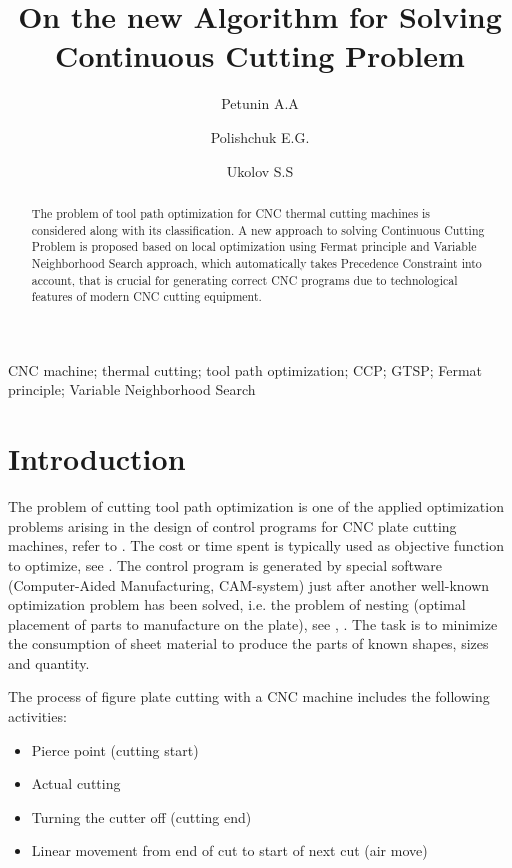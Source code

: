 \documentclass{ifacconf}
\begin{document}
\begin{frontmatter}

\title{On the new Algorithm for Solving Continuous Cutting Problem}

\author[urfu]{Petunin A.A}
\author[urfu]{Polishchuk E.G.}
\author[urfu]{Ukolov S.S}

\address[urfu]{Ural Federal University, Yekaterinburg, Russia}

\begin{abstract}                %
The problem of tool path optimization
for CNC thermal cutting machines is considered
along with its classification.
A new approach to solving
Continuous Cutting Problem
is proposed
based on local optimization
using Fermat principle
and Variable Neighborhood Search approach,
which automatically takes
Precedence Constraint into account,
that is crucial for generating
correct CNC programs
due to technological features
of modern CNC cutting equipment.
\end{abstract}

\begin{keyword}
CNC machine; thermal cutting;
tool path optimization;
CCP; GTSP;
Fermat principle;
Variable Neighborhood Search
\end{keyword}

\end{frontmatter}

\section{Introduction}

The problem of cutting tool path optimization
is one of the applied optimization problems arising
in the design of control programs for CNC plate cutting machines,
refer to \cite{Dewil2016Nov}.
The cost or time spent is typically used
as objective function to optimize,
see
\cite{Makarovskikh2018Feb}.
The control program is generated by special software
(Computer-Aided Manufacturing, CAM-system)
just after another well-known optimization problem
has been solved,
i.e. the problem of nesting
(optimal placement of parts to manufacture on the plate),
see \cite{huang2009optimal},
\cite{sherif2014sequential}.
The task is to minimize the consumption of sheet material
to produce the parts of known shapes, sizes and quantity.

The process of figure plate cutting with a CNC machine includes
the following activities:
\begin{itemize}
    \item{Pierce point} (cutting start)
    \item{Actual cutting}
    \item{Turning the cutter off} (cutting end)
    \item{Linear movement from end of cut to start of next cut} (air move)
\end{itemize}
\end{document}
